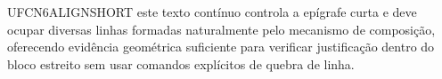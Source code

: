 UFCN6ALIGNSHORT este texto contínuo controla a epígrafe curta e deve ocupar diversas linhas formadas naturalmente pelo mecanismo de composição, oferecendo evidência geométrica suficiente para verificar justificação dentro do bloco estreito sem usar comandos explícitos de quebra de linha.
